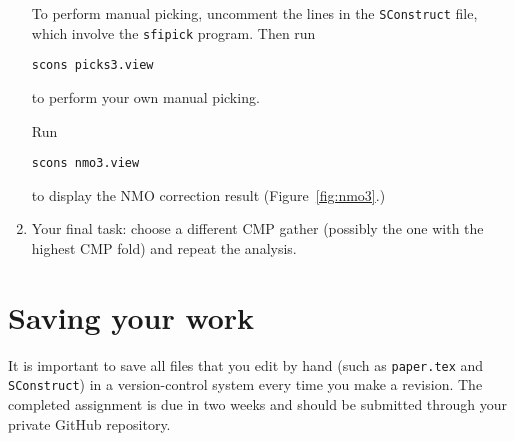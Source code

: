 \begin{enumerate}
To perform manual picking, uncomment the lines in the \texttt{SConstruct} file, which involve the \texttt{sfipick} program. Then run
\begin{verbatim}
scons picks3.view
\end{verbatim}
to perform your own manual picking.

Run
\begin{verbatim}
scons nmo3.view
\end{verbatim}
to display the NMO correction result (Figure~\ref{fig:nmo3}.)



\item Your final task: choose a different CMP gather (possibly the one with the highest CMP fold) and repeat the analysis. 

\end{enumerate}

\lstset{language=python,numbers=left,numberstyle=\tiny,showstringspaces=false}


\section{Saving your work}

It is important to save all files that you edit by hand (such
as \texttt{paper.tex} and \texttt{SConstruct}) in a version-control
system every time you make a revision.  The completed assignment is
due in two weeks and should be submitted through your private GitHub
repository.



